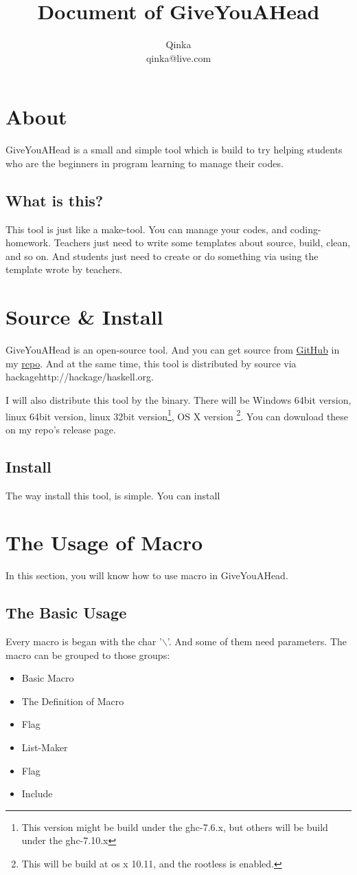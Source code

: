 \documentclass[UTF8]{article} %
\title{Document of GiveYouAHead}
\author{Qinka\\qinka@live.com}
\begin{document}
	
\maketitle
\newpage
\tableofcontents
\newpage
\section{About}
GiveYouAHead is a small and simple tool which is build to try helping students who are the beginners in program learning to manage their codes.
\subsection{What is this?}
This tool is just like a make-tool. You can manage your codes, and coding-homework. Teachers just need to write some templates about source, build, clean, and so on. And students just need to create or do something via using the template wrote by teachers. 
\section{Source \& Install}
GiveYouAHead is an open-source tool. And you can get source from
\href{https://github.com}{GitHub} in my \href{https://github.com/Qinka/GiveYouAHead}{repo}. And at the same time, this tool is distributed by source via hackage{http://hackage/haskell.org}.

I will also distribute this tool by the binary. There will be Windows 64bit version, linux 64bit version, linux 32bit version\footnote{This version might be build under the ghc-7.6.x, but others will be build under the ghc-7.10.x}, OS X version \footnote{This will be build at os x 10.11, and the rootless is enabled.}.
You can download these on my repo's release page.

\subsection{Install}
The way install this tool, is simple. You can install 
 
 
 
 
\section{The Usage of Macro}

In this section, you will know how to use macro in GiveYouAHead.
\subsection{The Basic Usage}
Every macro is began with the char '$\backslash$'. And some of them need parameters.
The macro can be grouped to those groups:
\begin{itemize}
    \item Basic Macro
    \item The Definition of Macro
    \item Flag
    \item List-Maker
    \item Flag
    \item Include
\end{itemize}
\end{document}

